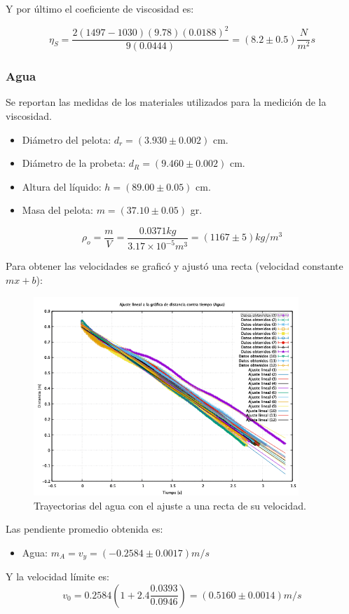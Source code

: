 \documentclass[a4paper]{article}
\begin{document}
Y por último el coeficiente de viscosidad es:

\begin{equation}
    \eta_S = \frac{2(1497-1030)(9.78)(0.0188)^2}{9(0.0444)} = (8.2\pm0.5) \frac{N}{m^2}s
\end{equation}


\subsubsection*{Agua}
Se reportan las medidas de los materiales utilizados para la medición de la viscosidad.
\begin{itemize}
    \item Diámetro del pelota: $d_r = (3.930\pm0.002)$ cm.
    \item Diámetro de la probeta: $d_R = (9.460\pm0.002)$ cm.
    \item Altura del líquido: $h = (89.00 \pm 0.05)$ cm.
    \item Masa del pelota: $m = (37.10\pm0.05)$ gr.
\end{itemize}

\begin{equation}
    \rho_o = \frac{m}{V} = \frac{0.0371 kg}{3.17\times10^{-5} m^3} = (1167\pm5) kg/m^3
\end{equation}

Para obtener las velocidades se graficó y ajustó una recta (velocidad constante $mx+b$):
\begin{figure}[H]
    \centering
    \includegraphics[width=10cm]{agua12.png}
    \caption{Trayectorias del agua con el ajuste a una recta de su velocidad.}
\end{figure}

Las pendiente promedio obtenida es:
\begin{itemize}
    \item Agua: $ m_A = v_y = (-0.2584\pm0.0017) m/s$
\end{itemize}
Y la velocidad límite es:
\begin{equation}
    v_0 = 0.2584 \left(1+ 2.4\frac{0.0393}{0.0946} \right) = (0.5160\pm0.0014) m/s
\end{equation}
\end{document}
